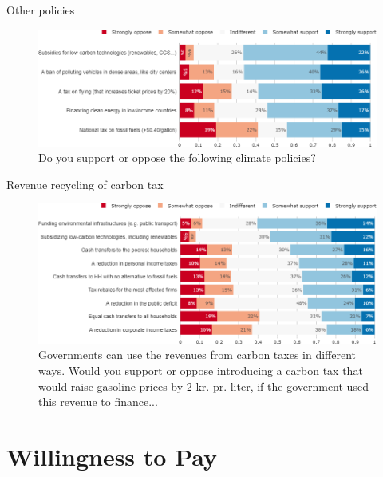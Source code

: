\documentclass[aspectratio=169,9pt,dvipsnames]{beamer}
\begin{document}
\begin{frame}{Other policies}%
\begin{figure}[h!]
\centering
\caption{Do you support or oppose the following climate policies?}
\vspace{2mm}
\includegraphics[width=\textwidth]{../figures/DK/policy_DK.png}
\end{figure}
\end{frame}

\begin{frame}{Revenue recycling of carbon tax}%
\begin{figure}[h!]
\centering
\caption{Governments can use the revenues from carbon taxes in different ways. Would you support or oppose introducing a carbon tax that would raise gasoline prices by 2 kr. pr. liter, if the government used this revenue to finance...}
\vspace{2mm}
\includegraphics[width=\textwidth]{../figures/DK/tax_DK.png}
\end{figure}
\end{frame}

\section{Willingness to Pay}
\end{document}
